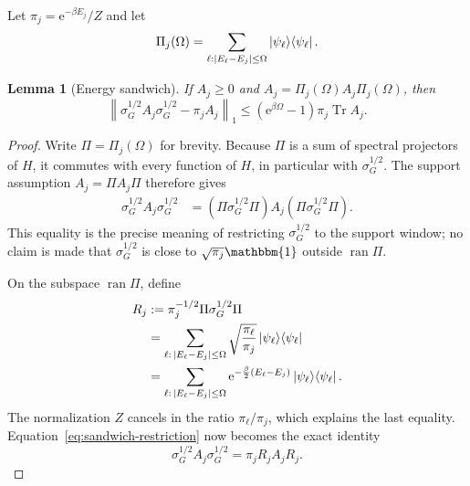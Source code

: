 \documentclass[aps,floatfix,10pt,amssymb,amsmath,superscriptaddress,nofootinbib,longbibliography,nobalancelastpage,twocolumn]{revtex4-2}
\newtheorem{lemma}{Lemma}
\newcommand{\id}{\mathbbm{1}}
\newcommand{\Tr}{\operatorname{Tr}}
\newcommand{\e}{\mathrm{e}}
\newcommand{\ketbra}[2]{\ket{#1}\!\bra{#2}}
\begin{document}
Let $\pi_j=\e^{-\beta E_j}/Z$ and let
\begin{equation}
 \Pi_j(\Omega)=\sum_{\ell:|E_\ell-E_j|\leq\Omega}
 \ketbra{\psi_\ell}{\psi_\ell}.
\end{equation}

\begin{lemma}[Energy sandwich]
\label{lem:sandwich}
If $A_j\geq0$ and $A_j=\Pi_j(\Omega)A_j\Pi_j(\Omega)$, then
\begin{equation}
 \left\|\sigma_G^{1/2}A_j\sigma_G^{1/2}-\pi_jA_j\right\|_1
 \leq(\e^{\beta\Omega}-1)\pi_j\Tr A_j.
 \label{eq:sandwich}
\end{equation}
\end{lemma}
\begin{proof}
Write $\Pi=\Pi_j(\Omega)$ for brevity.  Because $\Pi$ is a sum of spectral projectors of $H$, it commutes with every function of $H$, in particular with $\sigma_G^{1/2}$.  The support assumption $A_j=\Pi A_j\Pi$ therefore gives
\begin{align}
 \sigma_G^{1/2}A_j\sigma_G^{1/2}
 &=(\Pi\sigma_G^{1/2}\Pi)A_j
   (\Pi\sigma_G^{1/2}\Pi).
 \label{eq:sandwich-restriction}
\end{align}
This equality is the precise meaning of restricting $\sigma_G^{1/2}$ to the support window; no claim is made that $\sigma_G^{1/2}$ is close to $\sqrt{\pi_j}\id$ outside $\operatorname{ran}\Pi$.

On the subspace $\operatorname{ran}\Pi$, define
\begin{align}
 R_j
 &:=\pi_j^{-1/2}\Pi\sigma_G^{1/2}\Pi\nonumber\\
 &=\sum_{\ell:\,|E_\ell-E_j|\leq\Omega}
 \sqrt{\frac{\pi_\ell}{\pi_j}}\ketbra{\psi_\ell}{\psi_\ell}\nonumber\\
 &=\sum_{\ell:\,|E_\ell-E_j|\leq\Omega}
 \e^{-\frac\beta2(E_\ell-E_j)}
 \ketbra{\psi_\ell}{\psi_\ell}.
 \label{eq:Rj}
\end{align}
The normalization $Z$ cancels in the ratio $\pi_\ell/\pi_j$, which explains the last equality.  Equation~\eqref{eq:sandwich-restriction} now becomes the exact identity
\begin{equation}
 \sigma_G^{1/2}A_j\sigma_G^{1/2}
 =\pi_jR_jA_jR_j.
 \label{eq:sandwich-R}
\end{equation}


\end{proof}
\end{document}
